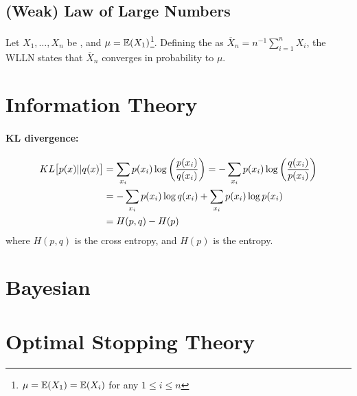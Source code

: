 \documentclass[11pt]{article}
\begin{document}
\subsection{(Weak) Law of Large Numbers}
Let $X_1, \dots, X_n$ be , and $\mu = \mathbb{E}(X_1)$\footnote{$\mu = \mathbb{E}(X_1) =
  \mathbb{E}(X_i)$ for any $1 \leq i \leq n$}. Defining the  as
$\overline{X}_n = n^{-1} \sum_{i=1}^n X_i$, the WLLN states that $\overline{X}_n$
converges in probability to $\mu$. 



\section{Information Theory}
\paragraph{KL divergence:}
\begin{align}
  KL\big[p(x) || q(x)\big]
  &= \sum_{x_i} p(x_i) \log \left( \frac{p(x_i)}{q(x_i)} \right)
    = -\sum_{x_i} p(x_i) \log \left( \frac{q(x_i)}{p(x_i)} \right) \nonumber\\ 
  &= -\sum_{x_i} p(x_i) \log q(x_i) + \sum_{x_i} p(x_i) \log p(x_i) \nonumber\\ 
  &= H(p,q) - H(p)
\end{align}
where $H(p,q)$ is the cross entropy, and $H(p)$ is the entropy.



\section{Bayesian}



\section{Optimal Stopping Theory}



\newpage
\printbibliography[heading=bibintoc]

\end{document}
